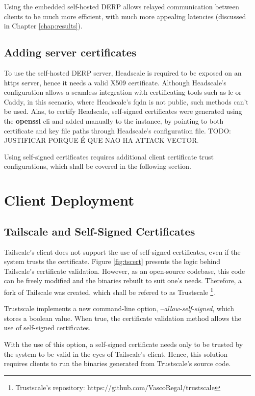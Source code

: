 \documentclass[11pt,twoside,a4paper]{report}
\begin{document}
Using the embedded self-hosted \ac{DERP} allows relayed communication between clients to be much more efficient, with much more appealing latencies (discussed in Chapter \ref{chap:results}).


\subsection{Adding server certificates}

To use the self-hosted \ac{DERP} server, Headscale is required to be exposed on an \ac{https} server, hence it needs a valid X509 certificate. Although Headscale's configuration allows a seamless integration with certificating tools such as \ac{le} or Caddy, in this scenario, where Headscale's \ac{fqdn} is not public, such methods can't be used. Alas, to certify Headscale, self-signed certificates were generated using the \textbf{openssl} \ac{cli} and added manually to the instance, by pointing to both certificate and key file paths through Headscale's configuration file. TODO: JUSTIFICAR PORQUE É QUE NAO HA ATTACK VECTOR.

Using self-signed certificates requires additional client certificate trust configurations, which shall be covered in the following section.

\section{Client Deployment}

\subsection{Tailscale and Self-Signed Certificates}

Tailscale's client does not support the use of self-signed certificates, even if the system trusts the certificate. Figure \ref{fig:tscert} presents the logic behind Tailscale's certificate validation. However, as an open-source codebase, this code can be freely modified and the binaries rebuilt to suit one's needs. Therefore, a fork of Tailscale was created, which shall be refered to as Trustscale \footnote{Trustscale's repository: https://github.com/VascoRegal/trustscale}.

Trustscale implements a new command-line option, --\emph{allow-self-signed}, which stores a boolean value. When true, the certificate validation method allows the use of self-signed certificates.

With the use of this option, a self-signed certificate needs only to be trusted by the system to be valid in the eyes of Tailscale's client. Hence, this solution requires clients to run the binaries generated from Trustscale's source code.
\end{document}
